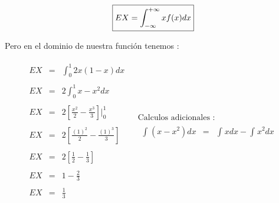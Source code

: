 \documentclass[12pt]{article}
\begin{document}
    \begin{equation*}
        \fbox{$
            EX = \displaystyle\int_{-\infty}^{+\infty}x f(x) dx
        $}
    \end{equation*}
      
    
    \begin{flushleft}
        Pero en el dominio de nuestra funci\'on tenemos : 
    \end{flushleft}
      
    \begin{center}
        \begin{equation*}
            \begin{array}{c|c}
                \begin{array}{rcl}
                    EX & = & \displaystyle\int_{0}^{1}2x \left(1-x\right) dx
                    \\
                    \\
                    EX & = &  2 \displaystyle\int_{0}^{1}x - x^2 dx
                    \\
                    \\
                    EX & = & \displaystyle 2\left[\frac{x^2}{2}- \frac{x^3}{3}\right]\vert_{0}^{1}
                    \\
                    \\
                    EX & = & \displaystyle 2\left[\frac{(1)^2}{2}- \frac{(1)^3}{3}\right]
                    \\
                    \\
                    EX & = & \displaystyle 2\left[\frac{1}{2}- \frac{1}{3}\right]
                    \\
                    \\
                    EX & = & \displaystyle 1-\frac{2}{3}
                    \\
                    \\
                    EX & = & \displaystyle \frac{1}{3}
                \end{array}
                &
                \begin{array}{l}
                    \mbox{Calculos adicionales :}
                    \\
                    \begin{array}{rcl}
                        \displaystyle \int_{}^{}\left(x-x^2\right)dx & = & \displaystyle\int_{}^{}x dx - \int_{}^{}x^2 dx
                        \\
                        \\

\end{array}
\end{array}
\end{array}
\end{equation*}
\end{center}
\end{document}
